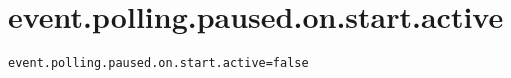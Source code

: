\section{event.polling.paused.on.start.active}
\label{configuration:EventPollingPausedOnStartActive}
\ClearAPI
\TODO
{}
\begin{lstlisting}[style=Props,caption={Usage example for \textit{event.polling.paused.on.start.active}}]
event.polling.paused.on.start.active=false
\end{lstlisting}